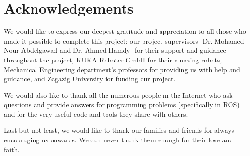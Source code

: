 
\chapter*{Acknowledgements}
%
%
%
%
%
%
%
%
%
%
%
We would like to express our deepest gratitude and appreciation to all those who made it possible to complete this project: our project supervisors- Dr. Mohamed Nour Abdelgawad and Dr. Ahmed Hamdy- for their support and guidance throughout the project,  KUKA Roboter GmbH for their amazing robots, Mechanical Engineering department's professors for providing us with help and guidance, and Zagazig University for funding our project.

We would also like to thank all the numerous people in the Internet who ask questions and provide answers for programming problems (specifically in ROS) and for the very useful code and tools they share with others.

Last but not least, we would like to thank our families and friends for always encouraging us onwards. We can never thank them enough for their love and faith.